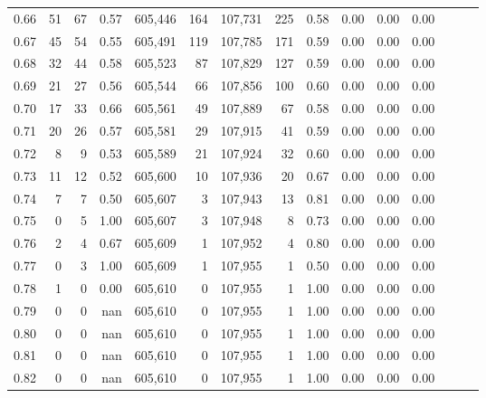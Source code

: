 \begin{tabular}{rrrrrrrrrrrrrrr}
0.66 &      51 &     67 &  0.57 &  605,446 &      164 &  107,731 &      225 &  0.58 &  0.00 &  0.00 &      0.00 \\
0.67 &      45 &     54 &  0.55 &  605,491 &      119 &  107,785 &      171 &  0.59 &  0.00 &  0.00 &      0.00 \\
0.68 &      32 &     44 &  0.58 &  605,523 &       87 &  107,829 &      127 &  0.59 &  0.00 &  0.00 &      0.00 \\
0.69 &      21 &     27 &  0.56 &  605,544 &       66 &  107,856 &      100 &  0.60 &  0.00 &  0.00 &      0.00 \\
0.70 &      17 &     33 &  0.66 &  605,561 &       49 &  107,889 &       67 &  0.58 &  0.00 &  0.00 &      0.00 \\
0.71 &      20 &     26 &  0.57 &  605,581 &       29 &  107,915 &       41 &  0.59 &  0.00 &  0.00 &      0.00 \\
0.72 &       8 &      9 &  0.53 &  605,589 &       21 &  107,924 &       32 &  0.60 &  0.00 &  0.00 &      0.00 \\
0.73 &      11 &     12 &  0.52 &  605,600 &       10 &  107,936 &       20 &  0.67 &  0.00 &  0.00 &      0.00 \\
0.74 &       7 &      7 &  0.50 &  605,607 &        3 &  107,943 &       13 &  0.81 &  0.00 &  0.00 &      0.00 \\
0.75 &       0 &      5 &  1.00 &  605,607 &        3 &  107,948 &        8 &  0.73 &  0.00 &  0.00 &      0.00 \\
0.76 &       2 &      4 &  0.67 &  605,609 &        1 &  107,952 &        4 &  0.80 &  0.00 &  0.00 &      0.00 \\
0.77 &       0 &      3 &  1.00 &  605,609 &        1 &  107,955 &        1 &  0.50 &  0.00 &  0.00 &      0.00 \\
0.78 &       1 &      0 &  0.00 &  605,610 &        0 &  107,955 &        1 &  1.00 &  0.00 &  0.00 &      0.00 \\
0.79 &       0 &      0 &   nan &  605,610 &        0 &  107,955 &        1 &  1.00 &  0.00 &  0.00 &      0.00 \\
0.80 &       0 &      0 &   nan &  605,610 &        0 &  107,955 &        1 &  1.00 &  0.00 &  0.00 &      0.00 \\
0.81 &       0 &      0 &   nan &  605,610 &        0 &  107,955 &        1 &  1.00 &  0.00 &  0.00 &      0.00 \\
0.82 &       0 &      0 &   nan &  605,610 &        0 &  107,955 &        1 &  1.00 &  0.00 &  0.00 &      0.00 \\

\end{tabular}
